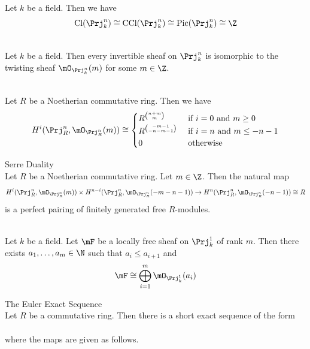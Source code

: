 \documentclass[a4paper]{article}
\begin{document}
\begin{prp}{}{}\\
Let $k$ be a field. Then we have $$\text{Cl}(\Prj_k^n)\cong\text{CCl}(\Prj_k^n)\cong\text{Pic}(\Prj_k^n)\cong\Z$$
\end{prp}

\begin{crl}{}{}\\
Let $k$ be a field. Then every invertible sheaf on $\Prj_k^n$ is isomorphic to the twisting sheaf $\mO_{\Prj_k^n}(m)$ for some $m\in\Z$. 
\end{crl}

\begin{prp}{}{}\\
Let $R$ be a Noetherian commutative ring. Then we have $$H^i(\Prj_R^n,\mO_{\Prj_R^n}(m))\cong\begin{cases}
R^{\binom{n+m}{m}} & \text{ if }i=0\text{ and }m\geq 0\\
R^{\binom{-m-1}{-n-m-1}} & \text{ if }i=n\text{ and }m\leq-n-1\\
0 & \text{ otherwise }
\end{cases}$$
\end{prp}

\begin{thm}{Serre Duality}{}\\
Let $R$ be a Noetherian commutative ring. Let $m\in\Z$. Then the natural map $$H^i(\Prj_R^n,\mO_{\Prj_R^n}(m))\times H^{n-i}(\Prj_R^n,\mO_{\Prj_R^n}(-m-n-1))\to H^n(\Prj_R^n,\mO_{\Prj_R^n}(-n-1))\cong R$$ is a perfect pairing of finitely generated free $R$-modules. 
\end{thm}

\begin{prp}{}{}\\
Let $k$ be a field. Let $\mF$ be a locally free sheaf on $\Prj_k^1$ of rank $m$. Then there exists $a_1,\dots,a_m\in\N$ such that $a_i\leq a_{i+1}$ and $$\mF\cong\bigoplus_{i=1}^m\mO_{\Prj_k^1}(a_i)$$
\end{prp}

\begin{thm}{The Euler Exact Sequence}{}\\
Let $R$ be a commutative ring. Then there is a short exact sequence of the form \\
 \\ where the maps are given as follows. 
\end{thm}
\end{document}
